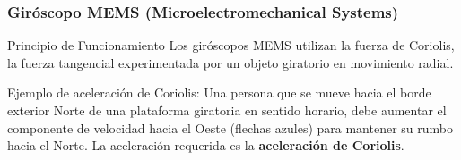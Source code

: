 \begin{frame}
    \frametitle{Giróscopo MEMS (Microelectromechanical Systems)}
    \footnotesize
    \begin{block}{Principio de Funcionamiento}
        Los giróscopos MEMS utilizan la fuerza de Coriolis, la fuerza tangencial experimentada por un objeto giratorio en movimiento radial.
    \end{block}

    \begin{figure}
        \hspace{2em}
        \hspace{2em}
    \end{figure}

    Ejemplo de aceleración de Coriolis:
    Una persona que se mueve hacia el borde exterior Norte de una plataforma giratoria en sentido horario, debe aumentar el componente de velocidad hacia el Oeste (flechas azules) para mantener su rumbo hacia el Norte. La aceleración requerida es la \textbf{aceleración de Coriolis}.


\end{frame}

